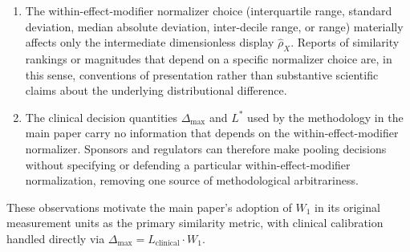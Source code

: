 \documentclass[11pt]{article}
\begin{document}
\begin{enumerate}
\item The within-effect-modifier normalizer choice (interquartile range, standard deviation, median absolute deviation, inter-decile range, or range) materially affects only the intermediate dimensionless display $\hat{\rho}_X$. Reports of similarity rankings or magnitudes that depend on a specific normalizer choice are, in this sense, conventions of presentation rather than substantive scientific claims about the underlying distributional difference.

\item The clinical decision quantities $\Delta_{\max}$ and $L^*$ used by the methodology in the main paper carry no information that depends on the within-effect-modifier normalizer. Sponsors and regulators can therefore make pooling decisions without specifying or defending a particular within-effect-modifier normalization, removing one source of methodological arbitrariness.
\end{enumerate}

These observations motivate the main paper's adoption of $W_1$ in its original measurement units as the primary similarity metric, with clinical calibration handled directly via $\Delta_{\max} = L_{\text{clinical}} \cdot W_1$.
\end{document}
